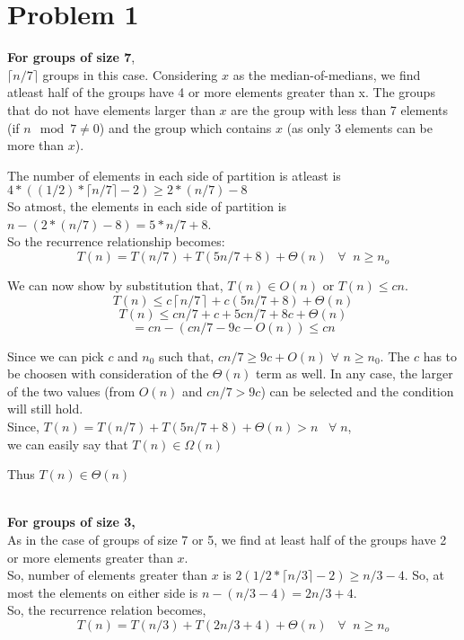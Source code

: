 \documentclass[12pt,letterpaper]{article}
\begin{document}
\section*{Problem 1}

  \textbf{For groups of size 7},\\
  $\lceil{n/7}\rceil$ groups in this case. Considering $x$ as the median-of-medians, 
  we find atleast half of the groups have 4 or more elements greater than x. The groups that do not have elements larger than 
  $x$ are the group with less than 7 elements (if $n \mod 7 \neq 0$) and the group which contains $x$ 
  (as only 3 elements can be more than $x$).

  The number of elements in each side of partition is atleast is $4*((1/2)*\lceil n/7\rceil-2)\geq 2*(n/7)-8$\\
  So atmost, the elements in each side of partition is $n-(2*(n/7)-8)=5*n/7+8$.\\
  So the recurrence relationship becomes:
  $$T(n) = T(n/7)+T(5n/7+8)+\Theta (n) \; \; \; \forall \; \; n\geq n_o$$ 

  We can now show by substitution that, $T(n) \in O(n)$ or $T(n) \leq cn$.
  $$T(n) \leq c\left\lceil n/7\right\rceil + c(5n/7+8) + \Theta (n)$$
  $$T(n) \leq cn/7 + c + 5cn/7 +8c + \Theta (n)$$
  $$= cn - (cn/7 -9c -O(n)) \leq cn$$

  Since we can pick $c$ and $n_0$ such that, $cn/7 \geq 9c+O(n)$  $\forall$ $n \geq n_0$. 
  The $c$ has to be choosen with consideration of the $\Theta(n)$ term as well. In any case, the larger of the two values (from $O(n)$ and $cn/7 > 9c$)
  can be selected and the condition will still hold. \\
  
  Since, $T(n) = T(n/7)+T(5n/7+8)+\Theta (n) >  n\; \; \; \forall \; n$,\\
  we can easily say that $T(n) \in \Omega (n)$
  
  Thus $T(n) \in \Theta (n)$
  
  \\
  \textbf{For groups of size 3,}\\
  As in the case of groups of size 7 or 5, we find at least half of the groups have 2 or more elements greater than $x$.\\
  So, number of elements greater than $x$ is $2(1/2*\lceil n/3\rceil-2) \geq n/3-4$. So, at most the elements on either side is $n-(n/3-4)=2n/3+4$.\\
  So, the recurrence relation becomes, 
  $$T(n) = T(n/3)+T(2n/3+4)+\Theta (n) \; \; \; \forall \; \; n\geq n_o$$
  
\end{document}
